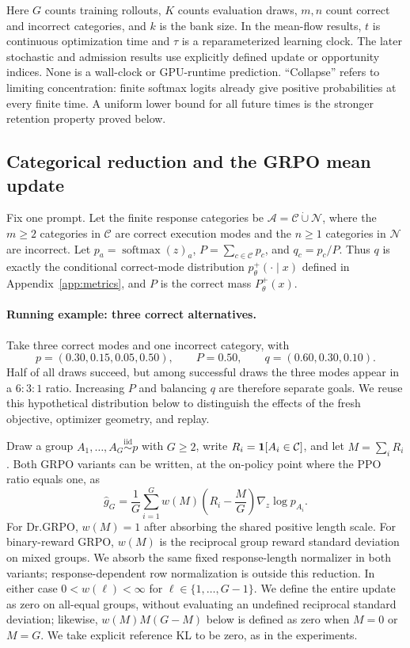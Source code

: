 Here $G$ counts training rollouts, $K$ counts evaluation draws, $m,n$ count
correct and incorrect categories, and $k$ is the bank size. In the mean-flow results, $t$ is
continuous optimization time and $\tau$ is a reparameterized learning clock.
The later stochastic and admission results use explicitly defined update or
opportunity indices. None is a wall-clock or GPU-runtime prediction. ``Collapse'' refers to
limiting concentration: finite softmax logits already give positive
probabilities at every finite time. A uniform lower bound for all future
times is the stronger retention property proved below.

\subsection{Categorical reduction and the GRPO mean update}
\label{app:theory-grpo-mean}

Fix one prompt. Let the finite response categories be
$\mathcal A=\mathcal C\mathbin{\dot\cup}\mathcal N$, where the $m\ge2$
categories in $\mathcal C$ are correct execution modes and the $n\ge1$
categories in $\mathcal N$ are incorrect. Let
$p_a=\operatorname{softmax}(z)_a$, $P=\sum_{c\in\mathcal C}p_c$, and
$q_c=p_c/P$. Thus $q$ is exactly the conditional correct-mode distribution
$p_\theta^+(\cdot\mid x)$ defined in Appendix~\ref{app:metrics}, and $P$ is the correct
mass $P_\theta^+(x)$.

\paragraph{Running example: three correct alternatives.}
\label{ex:theory-running}
Take three correct modes and one incorrect category, with
\[
 p=(0.30,0.15,0.05,0.50),\qquad P=0.50,\qquad q=(0.60,0.30,0.10).
\]
Half of all draws succeed, but among successful draws the three modes appear
in a $6{:}3{:}1$ ratio. Increasing $P$ and balancing $q$ are therefore
separate goals. We reuse this hypothetical distribution below to distinguish
the effects of the fresh objective, optimizer geometry, and replay.

Draw a group $A_1,\ldots,A_G\stackrel{\mathrm{iid}}{\sim}p$ with $G\ge2$,
write $R_i=\mathbf 1[A_i\in\mathcal C]$, and let $M=\sum_iR_i$. Both GRPO variants
can be written, at the on-policy point where the PPO ratio equals one, as
\begin{equation}
  \widehat g_G
  =\frac1G\sum_{i=1}^G
   w(M)\left(R_i-\frac{M}{G}\right)\nabla_z\log p_{A_i}.
  \label{eq:group-estimator}
\end{equation}
For Dr.GRPO, $w(M)=1$ after absorbing the shared positive length scale. For
binary-reward GRPO, $w(M)$ is the reciprocal group reward standard deviation
on mixed groups. We absorb the same fixed response-length normalizer in both
variants; response-dependent row normalization is outside this reduction.
In either case $0<w(\ell)<\infty$ for $\ell\in\{1,\ldots,G-1\}$.
We define the entire update as zero on all-equal groups, without evaluating an
undefined reciprocal standard deviation; likewise, $w(M)M(G-M)$ below is
defined as zero when $M=0$ or $M=G$. We take explicit reference KL to be zero, as
in the experiments.

